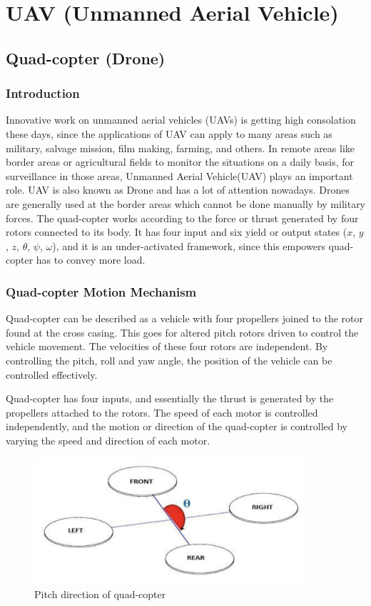 \chapter{UAV (Unmanned Aerial Vehicle)}
\section{Quad-copter (Drone)}
\subsection{Introduction} 
\par  Innovative work on unmanned aerial vehicles (UAVs) is getting high consolation these days, since the applications of UAV can apply to many areas such as military, salvage mission, film making, farming, and others.
In remote areas like border areas or agricultural fields to monitor the situations on a daily basis, for surveillance in those areas, Unmanned Aerial Vehicle(UAV) plays an important role. UAV is also known as Drone and has a lot of attention nowadays. Drones are generally used at the border areas which cannot be done manually by military forces.
The quad-copter works according to the force or thrust generated by four rotors connected to its body. It has four input and six yield or output states ($x$, $y$, $z$, $\theta$, $\psi$, $\omega$), and it is an under-activated framework, since this empowers quad-copter has to convey more load.
\subsection{Quad-copter Motion Mechanism}
\par Quad-copter can be described as a vehicle with four propellers joined to the rotor found at the cross casing. This goes for altered pitch rotors driven to control the vehicle movement. The velocities of these four rotors are independent. By controlling the pitch, roll and yaw angle, the position of the vehicle can be controlled effectively.
\par Quad-copter has four inputs, and essentially the thrust is generated by the propellers attached to the rotors. The speed of each motor is controlled independently, and the motion or direction of the quad-copter is controlled by varying the speed and direction of each motor.
\begin{figure}[h!]
\centering
\includegraphics[width=10cm]{./Figures/pitch_direction.png}
\caption{Pitch direction of quad-copter}
\label{Pitch_direction_of_quadcopter}
\end{figure}

